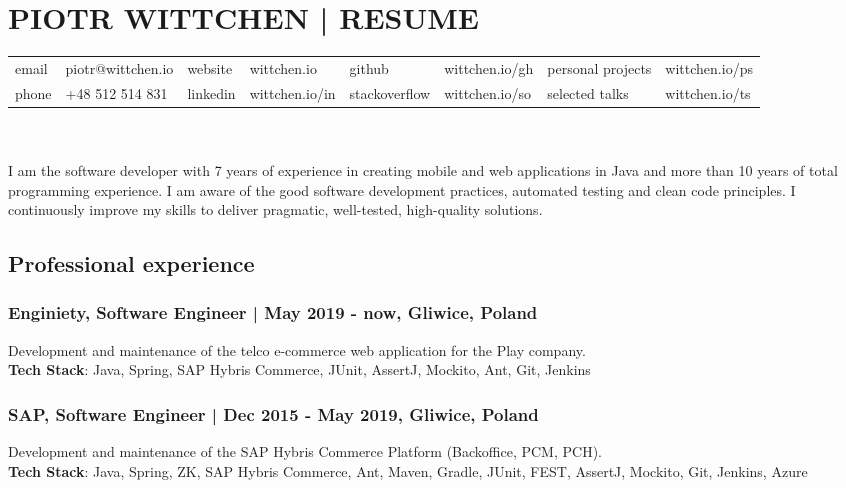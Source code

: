 \documentclass[8pt]{extarticle}
\begin{document}
  \small

  \section*{\large{PIOTR WITTCHEN | RESUME}}

  \begin{tabular}{llllllll}
      email  & piotr@wittchen.io & website  & wittchen.io    & github        & wittchen.io/gh & personal projects & wittchen.io/ps \\
      phone  & +48 512 514 831   & linkedin & wittchen.io/in & stackoverflow & wittchen.io/so & selected talks    & wittchen.io/ts \\
  \end{tabular} \\ \\

    I am the software developer with 7 years of experience in creating mobile and web applications in Java and more than 10 years of total programming experience. I am aware of the good software development practices, automated testing and clean code principles. I continuously improve my skills to deliver pragmatic, well-tested, high-quality solutions.

    \subsection*{\normalsize{Professional experience}}

      \subsubsection*{\normalsize{Enginiety, Software Engineer | May 2019 - now, Gliwice, Poland}}
      Development and maintenance of the telco e-commerce web application for the Play company.\\
      \textbf{Tech Stack}: Java, Spring, SAP Hybris Commerce, JUnit, AssertJ, Mockito, Ant, Git, Jenkins

      \subsubsection*{\normalsize{SAP, Software Engineer | Dec 2015 - May 2019, Gliwice, Poland}}
      Development and maintenance of the SAP Hybris Commerce Platform (Backoffice, PCM, PCH).\\
      \textbf{Tech Stack}: Java, Spring, ZK, SAP Hybris Commerce, Ant, Maven, Gradle,
      JUnit, FEST, AssertJ, Mockito, Git, Jenkins, Azure
\end{document}
